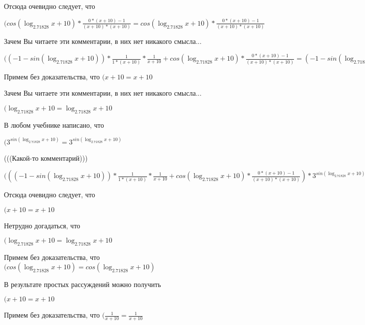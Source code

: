 \documentclass[12pt,a4paper,fleqn]{article}
\theoremstyle{definition}
\begin{document}
Отсюда очевидно следует, что

$(cos(\log_{ 2.71828 }{ x  +  10 }) * \frac{ 0  * ( x  +  10 ) -  1 }{( x  +  10 ) * ( x  +  10 )}
 = cos(\log_{ 2.71828 }{ x  +  10 }) * \frac{ 0  * ( x  +  10 ) -  1 }{( x  +  10 ) * ( x  +  10 )}
$

Зачем Вы читаете эти комментарии, в них нет никакого смысла...

$(( -1  - sin(\log_{ 2.71828 }{ x  +  10 })) * \frac{ 1 }{ 1  * ( x  +  10 )}
 * \frac{ 1 }{ x  +  10 }
 + cos(\log_{ 2.71828 }{ x  +  10 }) * \frac{ 0  * ( x  +  10 ) -  1 }{( x  +  10 ) * ( x  +  10 )}
 = ( -1  - sin(\log_{ 2.71828 }{ x  +  10 })) * \frac{ 1 }{ 1  * ( x  +  10 )}
 * \frac{ 1 }{ x  +  10 }
 + cos(\log_{ 2.71828 }{ x  +  10 }) * \frac{ 0  * ( x  +  10 ) -  1 }{( x  +  10 ) * ( x  +  10 )}
$

Примем без доказательства, что
$( x  +  10  =  x  +  10 $

Зачем Вы читаете эти комментарии, в них нет никакого смысла...

$(\log_{ 2.71828 }{ x  +  10 } = \log_{ 2.71828 }{ x  +  10 }$

В любом учебнике написано, что

$({ 3 }^{sin(\log_{ 2.71828 }{ x  +  10 })} = { 3 }^{sin(\log_{ 2.71828 }{ x  +  10 })}$

(((Какой-то комментарий)))

$((( -1  - sin(\log_{ 2.71828 }{ x  +  10 })) * \frac{ 1 }{ 1  * ( x  +  10 )}
 * \frac{ 1 }{ x  +  10 }
 + cos(\log_{ 2.71828 }{ x  +  10 }) * \frac{ 0  * ( x  +  10 ) -  1 }{( x  +  10 ) * ( x  +  10 )}
) * { 3 }^{sin(\log_{ 2.71828 }{ x  +  10 })} = (( -1  - sin(\log_{ 2.71828 }{ x  +  10 })) * \frac{ 1 }{ 1  * ( x  +  10 )}
 * \frac{ 1 }{ x  +  10 }
 + cos(\log_{ 2.71828 }{ x  +  10 }) * \frac{ 0  * ( x  +  10 ) -  1 }{( x  +  10 ) * ( x  +  10 )}
) * { 3 }^{sin(\log_{ 2.71828 }{ x  +  10 })}$

Отсюда очевидно следует, что

$( x  +  10  =  x  +  10 $

Нетрудно догадаться, что

$(\log_{ 2.71828 }{ x  +  10 } = \log_{ 2.71828 }{ x  +  10 }$

Примем без доказательства, что
$(cos(\log_{ 2.71828 }{ x  +  10 }) = cos(\log_{ 2.71828 }{ x  +  10 })$

В результате простых рассуждений можно получить

$( x  +  10  =  x  +  10 $

Примем без доказательства, что
$(\frac{ 1 }{ x  +  10 }
 = \frac{ 1 }{ x  +  10 }
$
\end{document}
